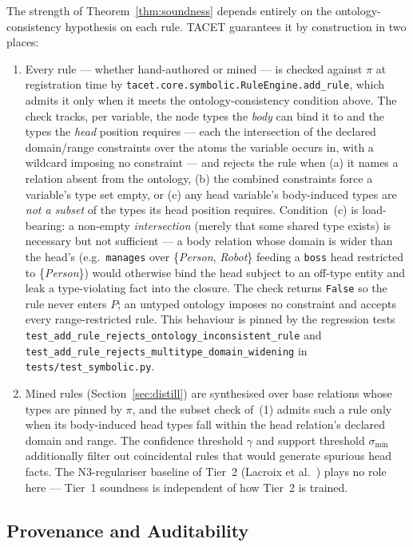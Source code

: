 \documentclass[11pt]{article}
\theoremstyle{plain}
\begin{document}
The strength of Theorem~\ref{thm:soundness} depends entirely on the
ontology-consistency hypothesis on each rule.  TACET guarantees it by
construction in two places:
\begin{enumerate}
\item Every rule --- whether hand-authored or mined --- is checked
against $\pi$ at registration time by
\texttt{tacet.core.symbolic.RuleEngine.add\_rule}, which admits it only
when it meets the ontology-consistency condition above.  The check tracks,
per variable, the node types the \emph{body} can bind it to and the types
the \emph{head} position requires --- each the intersection of the
declared domain/range constraints over the atoms the variable occurs in,
with a wildcard imposing no constraint --- and rejects the rule when
(a) it names a relation absent from the ontology, (b) the combined
constraints force a variable's type set empty, or (c) any head variable's
body-induced types are \emph{not a subset} of the types its head position
requires.  Condition~(c) is load-bearing: a non-empty \emph{intersection}
(merely that some shared type exists) is necessary but not sufficient ---
a body relation whose domain is wider than the head's (e.g.\
\texttt{manages} over \{\textit{Person}, \textit{Robot}\} feeding a
\texttt{boss} head restricted to \{\textit{Person}\}) would otherwise bind
the head subject to an off-type entity and leak a type-violating fact into
the closure.  The check returns \texttt{False} so the rule never enters
$P$; an untyped ontology imposes no constraint and accepts every
range-restricted rule.  This behaviour is pinned by the regression tests
\texttt{test\_add\_rule\_rejects\_ontology\_inconsistent\_rule} and
\texttt{test\_add\_rule\_rejects\_multitype\_domain\_widening} in
\texttt{tests/test\_symbolic.py}.
\item Mined rules (Section~\ref{sec:distill}) are
synthesised over base relations whose types are pinned by $\pi$, and the
subset check of~(1) admits such a rule only when its body-induced head
types fall within the head relation's declared domain and range.  The
confidence threshold $\gamma$ and support threshold $\sigma_{\mathrm{min}}$ additionally
filter out coincidental rules that would generate spurious head facts.
The N3-regulariser baseline of Tier~2 (Lacroix et al.\
\cite{lacroix2018complex_n3}) plays no role here --- Tier~1 soundness
is independent of how Tier~2 is trained.
\end{enumerate}

\subsection{Provenance and Auditability}
\label{sec:provenance}
\end{document}
